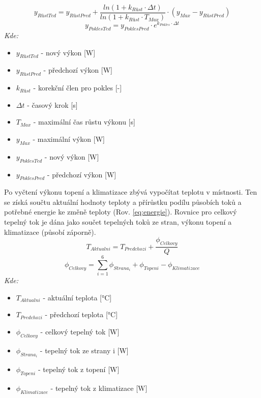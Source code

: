 \begin{equation}
    y_{RůstTed} = y_{RůstPred} + \frac{ln(1 + k_{Růst} \cdot \Delta t)}{ln(1 + k_{Růst} \cdot T_{Max})} \cdot (y_{Max} - y_{RůstPred}) 
    \label{eq:rust_rekurzivni}
\end{equation}
\begin{equation}
    y_{PoklesTed} = y_{PoklesPred} \cdot e^{k_{Pokles} \cdot \Delta t}
    \label{eq:pokles_rekurzivni}
\end{equation}
\noindent\textit{Kde:}
\begin{itemize}
    \item $y_{RůstTed}$ - nový výkon [W]
    \item $y_{RůstPred}$ - předchozí výkon [W]
    \item $k_{Růst}$ - korekční člen pro pokles [-]
    \item $\Delta t$ - časový krok [s]
    \item $T_{Max}$ - maximální čas růstu výkonu [s]
    \item $y_{Max}$ - maximální výkon [W]
    \item $y_{PoklesTed}$ - nový výkon [W]
    \item $y_{PoklesPred}$ - předchozí výkon [W] \newline
\end{itemize}
\noindent Po vyčtení výkonu topení a klimatizace zbývá vypočítat teplotu v místnosti. Ten se získá součtu aktuální hodnoty teploty a přírůstku podílu působích toků a potřebné energie ke změně teploty (Rov. \ref{eq:energie}). Rovnice pro celkový tepelný tok je dána jako součet tepelných toků ze stran, výkonu topení a klimatizace (působí záporně).
\begin{equation}
    T_{Aktualni} = T_{Predchozi} + \frac{\phi _{Celkovy}}{Q}
    \label{eq:aktualni_teplota}
\end{equation}
\begin{equation}
    \phi _{Celkovy} = \sum_{i=1}^{6} \phi _{Strana_i} + \phi _{Topeni} - \phi _{Klimatizace}
    \label{eq:celkovy_tepelny_tok}
\end{equation}
\noindent\textit{Kde:}
\begin{itemize}
    \item $T_{Aktualni}$ - aktuální teplota [°C]
    \item $T_{Predchozi}$ - předchozí teplota [°C]
    \item $\phi _{Celkovy}$ - celkový tepelný tok [W]
    \item $\phi _{Strana_i}$ - tepelný tok ze strany i [W]
    \item $\phi _{Topeni}$ - tepelný tok z topení [W]
    \item $\phi _{Klimatizace}$ - tepelný tok z klimatizace [W] \newline
\end{itemize}


